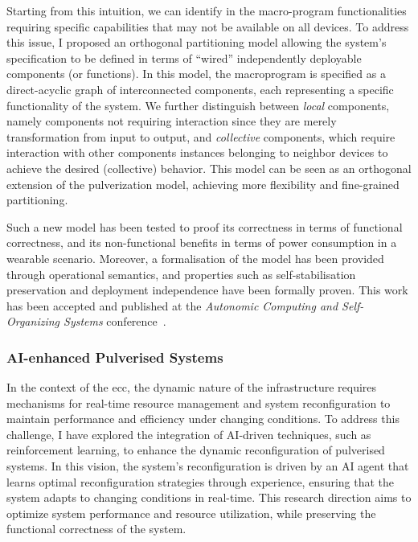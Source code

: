 \documentclass[runningheads]{llncs}
\begin{document}
Starting from this intuition,
we can identify in the macro-program functionalities requiring specific capabilities that may not be available on all devices.
%
To address this issue,
I proposed an orthogonal partitioning model allowing the system's specification to be defined in terms of ``wired'' independently deployable components (or functions).
%
In this model,
the macroprogram is specified as a direct-acyclic graph of interconnected components,
each representing a specific functionality of the system.
%
We further distinguish between \emph{local} components,
namely components not requiring interaction since they are merely transformation from input to output,
and \emph{collective} components,
which require interaction with other components instances belonging to neighbor devices to achieve the desired (collective) behavior.
%
This model can be seen as an orthogonal extension of the pulverization model,
achieving more flexibility and fine-grained partitioning.

Such a new model has been tested to proof its correctness in terms of functional correctness,
and its non-functional benefits in terms of power consumption in a wearable scenario.
Moreover,
a formalisation of the model has been provided through operational semantics,
and properties such as self-stabilisation preservation and deployment independence have been formally proven.
%
This work has been accepted and published at the \emph{Autonomic Computing and Self-Organizing Systems} conference~\cite{DBLP:conf/acsos/FarabegoliVC24}.

\subsubsection{AI-enhanced Pulverised Systems}

In the context of the \ac{ecc},
the dynamic nature of the infrastructure requires mechanisms for real-time resource management and system reconfiguration to maintain performance and efficiency under changing conditions.
%
To address this challenge,
I have explored the integration of AI-driven techniques,
such as reinforcement learning,
to enhance the dynamic reconfiguration of pulverised systems.
%
In this vision,
the system's reconfiguration is driven by an AI agent that learns optimal reconfiguration strategies through experience,
ensuring that the system adapts to changing conditions in real-time.
%
This research direction aims to optimize system performance and resource utilization,
while preserving the functional correctness of the system.
\end{document}
